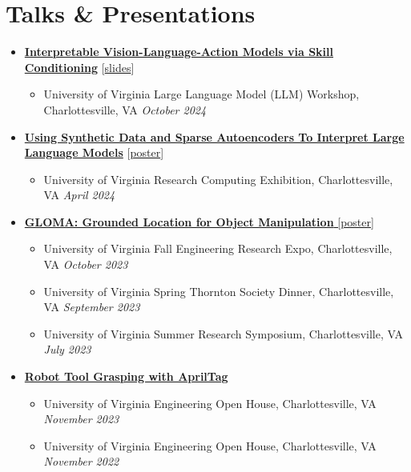 \documentclass[letterpaper,11pt]{article}
\newcommand{\linkhref}[2]{\textcolor{linkblue}{\href{#1}{#2}}}
\newcommand{\Date}[1]{\textit{\small #1}}
\begin{document}
\section{Talks \& Presentations}
\begin{itemize}[label={}, leftmargin=0pt]
  \item {\href{https://www.brandonyifanyang.com/skillvla.pdf}{\textbf{Interpretable Vision-Language-Action Models via Skill Conditioning}} [\linkhref{https://www.brandonyifanyang.com/skillvla.pdf}{slides}]}
        \begin{itemize}
          \item University of Virginia Large Language Model (LLM) Workshop, Charlottesville, VA \hfill \Date{October 2024}
        \end{itemize}
  \item {\href{https://www.brandonyifanyang.com/MI.pdf}{\textbf{Using Synthetic Data and Sparse Autoencoders To Interpret Large Language Models}} [\linkhref{https://www.brandonyifanyang.com/MI.pdf}{poster}]}
        \begin{itemize}
          \item University of Virginia Research Computing Exhibition, Charlottesville, VA \hfill \Date{April 2024}
        \end{itemize}
  \item \href{https://www.brandonyifanyang.com/gloma.pdf}{\textbf{GLOMA: Grounded Location for Object Manipulation} [\linkhref{https://www.brandonyifanyang.com/gloma.pdf}{poster}]}
        \begin{itemize}
          \item University of Virginia Fall Engineering Research Expo, Charlottesville, VA \hfill \Date{October 2023}
          \item University of Virginia Spring Thornton Society Dinner, Charlottesville, VA \hfill \Date{September 2023}
          \item University of Virginia Summer Research Symposium, Charlottesville, VA \hfill \Date{July 2023}
        \end{itemize}
  \item \href{https://github.com/branyang02/apriltag_detection}{\textbf{Robot Tool Grasping with AprilTag}}
        \begin{itemize}
          \item University of Virginia Engineering Open House, Charlottesville, VA \hfill \Date{November 2023}
          \item University of Virginia Engineering Open House, Charlottesville, VA \hfill \Date{November 2022}
        \end{itemize}
\end{itemize}
\end{document}
